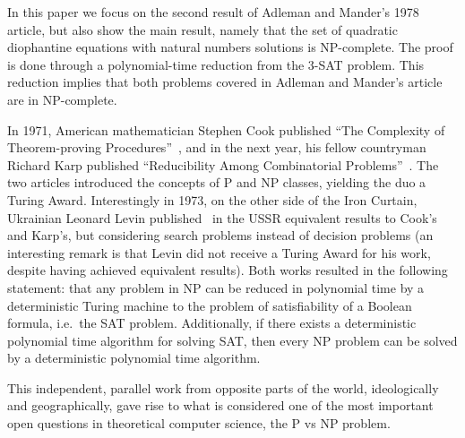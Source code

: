 \documentclass{amsart}
\theoremstyle{plain}
\numberwithin{equation}{section}
\begin{document}
In this paper we focus on the second result of Adleman and Mander's 1978 article, but also show the
main result, namely that the set of quadratic diophantine equations with natural numbers solutions
is NP-complete. The proof is done through a polynomial-time reduction from the 3-SAT problem. This
reduction implies that both problems covered in Adleman and Mander's article are in NP-complete.

In 1971, American mathematician Stephen Cook published ``The Complexity of Theorem-proving
Procedures''~\cite{cook}, and in the next year, his fellow countryman Richard Karp published
``Reducibility Among Combinatorial Problems''~\cite{karp}. The two articles introduced the concepts
of P and NP classes, yielding the duo a Turing Award. Interestingly in 1973, on the other side of
the Iron Curtain, Ukrainian Leonard Levin published~\cite{levin} in the USSR equivalent results to
Cook's and Karp's, but considering search problems instead of decision problems (an interesting
remark is that Levin did not receive a Turing Award for his work, despite having achieved
equivalent results). Both works resulted in the following statement: that any problem in NP can be
reduced in polynomial time by a deterministic Turing machine to the problem of satisfiability of a
Boolean formula, i.e.\ the SAT problem.  Additionally, if there exists a deterministic polynomial
time algorithm for solving SAT, then every NP problem can be solved by a deterministic polynomial
time algorithm.

This independent, parallel work from opposite parts of the world, ideologically and geographically,
gave rise to what is considered one of the most important open questions in theoretical computer
science, the P vs NP problem.
\end{document}
